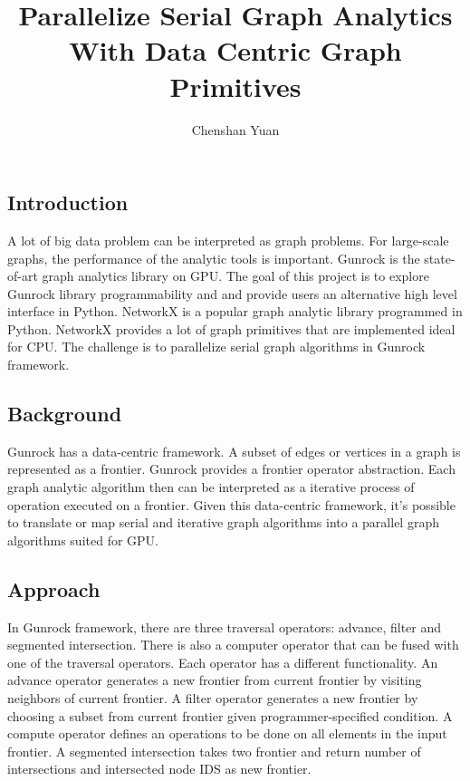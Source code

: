 \documentclass[12pt, letterpaper]{article}
\title{Parallelize Serial Graph Analytics With Data Centric Graph Primitives}
\author{Chenshan Yuan}
\date{}
\begin{document}
\maketitle

\subsection*{Introduction}
A lot of big data problem can be interpreted as graph problems. For large-scale graphs, the performance of the analytic tools is important. Gunrock is the state-of-art graph analytics library on GPU.\cite{DBLP:journals/corr/WangPDWYWOYLRO17} The goal of this project is to explore Gunrock library programmability and and provide users an alternative high level interface in Python. NetworkX is a popular graph analytic library programmed in Python. \cite{hagberg-2008-exploring} NetworkX provides  a lot of  graph primitives  that  are implemented ideal for CPU. The challenge is to parallelize serial graph algorithms in Gunrock framework.  


\subsection*{Background}

Gunrock has a data-centric framework. A subset of edges or vertices in a graph is represented as a frontier. Gunrock provides a frontier operator abstraction. Each graph analytic algorithm then can be interpreted as a iterative process of operation executed on a frontier. Given this data-centric framework, it's possible to translate or map serial and iterative graph algorithms into a parallel graph algorithms suited for GPU.  

\subsection*{Approach}

In Gunrock framework, there are three traversal operators: advance, filter and segmented intersection.  There is also a  computer operator that can be fused with  one of the traversal operators.  Each  operator has a different functionality. An advance operator  generates a new frontier from current frontier by visiting  neighbors of  current frontier. A  filter operator generates a new frontier  by choosing a subset  from current frontier given programmer-specified  condition.  A compute operator defines an operations to be done  on all elements  in the input frontier. A segmented intersection takes two frontier and return number of intersections  and  intersected node IDS as new frontier.
\end{document}
